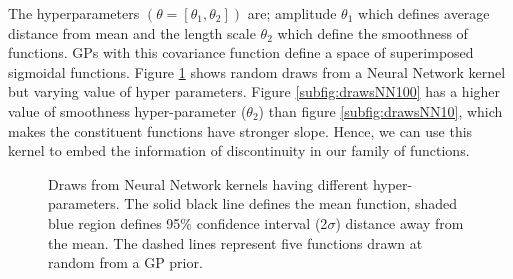 The hyperparameters $(\theta = [\theta_{1}, \theta_{2}])$ are; amplitude $\theta_{1}$ which defines average distance from mean and the length scale $\theta_{2}$ which define the smoothness of functions. GPs with this covariance function define a space of superimposed sigmoidal functions. Figure \ref{figNNPrior} shows random draws from a Neural Network kernel but varying value of hyper parameters. Figure \ref{subfig:drawsNN100} has a higher value of smoothness hyper-parameter ($\theta_{2}$) than figure \ref{subfig:drawsNN10}, which makes the constituent functions have stronger slope. Hence, we can use this kernel to embed the information of discontinuity in our family of functions. 

\begin{figure}[!ht]
  \centering
  \quad
    \quad
  \caption{Draws from Neural Network kernels having different hyper-parameters. The solid black line defines the mean function, shaded blue region defines 95\% confidence interval (2$\sigma$) distance away from the mean. The dashed lines represent five functions drawn at random from a GP prior.}
  \label{figNNPrior}
\end{figure}

